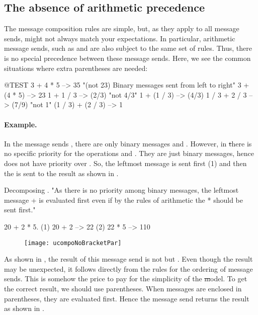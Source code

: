 \documentclass[a4paper,10pt,twoside]{book}
\begin{document}
\subsection{The absence of arithmetic precedence}
The message composition rules are simple, but, as they apply to all message sends, might not always match your expectations.
In particular, arithmetic message sends, such as \ct{+} and \ct{*} are also subject to the same set of rules.
Thus, there is no special precedence between these message sends.
Here, we see the common situations where extra parentheses are needed:

\begin{code}{@TEST}
3 + 4 * 5      --> 35    "(not 23)  Binary messages sent from left to right"
3 + (4 * 5)    --> 23
1 + 1 / 3         --> (2/3)    "not 4/3"
1 + (1 / 3)       --> (4/3)
1 / 3 + 2 / 3       --> (7/9)    "not 1"
(1 / 3) + (2 / 3)  --> 1
\end{code}

\paragraph{Example.}
In the message sends , there are only binary messages \ct{+} and \ct{*}.
However, in \st there is no specific priority for the operations \ct{+} and \ct{*}.
They are just binary messages, hence \ct{*} does not have priority over \ct{+}.
So, the leftmost message \ct{+} is sent first (1) and then the \ct{*} is sent to the result as shown in .

\begin{example}[binaryMessages1]{Decomposing .}{}
"As there is no priority among binary messages, the leftmost message + is evaluated first even if by the rules of arithmetic the * should be sent first."

      20 + 2 * 5.
(1)  20 + 2 --> 22
(2)  22       * 5 --> 110
\end{example}

\begin{figure}
\begin{center}\texttt{[image: ucompoNoBracketPar]}\end{center}
\end{figure}
\noindent
As shown in , the result of this message send is not  but .
Even though the result may be unexpected, it follows directly from the rules for the ordering of message sends.
This is somehow the price to pay for the simplicity of the \st model.
To get the correct result, we should use parentheses.
When messages are enclosed in parentheses, they are evaluated first.
Hence the message send  returns the result as shown in .
\end{document}
